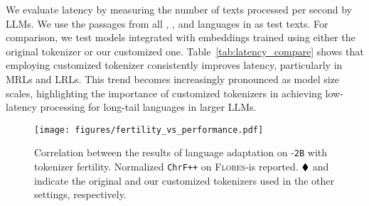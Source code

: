 
We evaluate latency by measuring the number of texts processed per second by LLMs. We use the passages from all \sea, \afr, and \ind languages in \belebele as test texts. For comparison, we test \ouradapter models integrated with embeddings trained using either the original \gemmatwo tokenizer or our customized one. Table~\ref{tab:latency_compare} shows that employing customized tokenizer consistently improves latency, particularly in MRLs and LRLs. This trend becomes increasingly pronounced as model size scales, highlighting the importance of customized tokenizers in achieving low-latency processing for long-tail languages in larger LLMs.

\begin{figure}[t]
    \setlength{\abovecaptionskip}{-0.0001cm}
    \setlength{\belowcaptionskip}{-0.35cm}
    \centering
    \texttt{[image: figures/fertility\_vs\_performance.pdf]}
    \vspace{-8.5mm}
    \caption{Correlation between the results of language adaptation on \gemmatwo-\texttt{2B} with tokenizer fertility. Normalized \texttt{ChrF++} on \textsc{Flores}-\sea is reported. {$\mathbin{\blacklozenge}$} and {\pfix}  indicate the original and our customized tokenizers used in the other settings, respectively.}
    \vspace{-5.5mm}
    \label{fig:fertility_vs_performance}
\end{figure}

